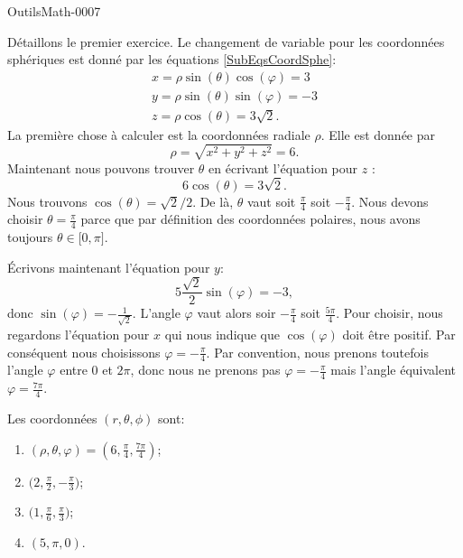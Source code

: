 
\begin{corrige}{OutilsMath-0007}

	Détaillons le premier exercice. Le changement de variable pour les coordonnées sphériques est donné par les équations \eqref{SubEqsCoordSphe}:
	\begin{subequations}
		\begin{align}
			x=\rho\sin(\theta)\cos(\varphi)=3\\
			y=\rho\sin(\theta)\sin(\varphi)=-3\\
			z=\rho\cos(\theta)=3\sqrt{2}.
		\end{align}
	\end{subequations}
	La première chose à calculer est la coordonnées radiale $\rho$. Elle est donnée par
	\begin{equation}
		\rho=\sqrt{x^2+y^2+z^2}=6.
	\end{equation}
	Maintenant nous pouvons trouver $\theta$ en écrivant l'équation pour $z$ :
	\begin{equation}
		6\cos(\theta)=3\sqrt{2}.
	\end{equation}
	Nous trouvons $\cos(\theta)=\sqrt{2}/2$. De là, $\theta$ vaut soit $\frac{ \pi }{ 4 }$ soit $-\frac{ \pi }{ 4 }$. Nous devons choisir $\theta=\frac{ \pi }{ 4 }$ parce que par définition des coordonnées polaires, nous avons toujours $\theta\in\mathopen[ 0 , \pi \mathclose]$.

	Écrivons maintenant l'équation pour $y$:
	\begin{equation}
		5\frac{ \sqrt{2} }{2}\sin(\varphi)=-3,
	\end{equation}
	donc $\sin(\varphi)=-\frac{1}{ \sqrt{2} }$. L'angle $\varphi$ vaut alors soir $-\frac{ \pi }{ 4 }$ soit $\frac{ 5\pi }{ 4 }$. Pour choisir, nous regardons l'équation pour $x$ qui nous indique que $\cos(\varphi)$ doit être positif. Par conséquent nous choisissons $\varphi=-\frac{ \pi }{ 4 }$. Par convention, nous prenons toutefois l'angle $\varphi$ entre $0$ et $2\pi$, donc nous ne prenons pas $\varphi=-\frac{ \pi }{ 4 }$ mais l'angle équivalent $\varphi=\frac{ 7\pi }{ 4 }$.

	Les coordonnées $(r,\theta,\phi)$ sont:
	\begin{enumerate}
		\item	
			$(\rho,\theta,\varphi)=(6,\frac{ \pi }{ 4 },\frac{ 7\pi }{ 4 })$;
		\item
			$\big( 2,\frac{ \pi }{2},-\frac{ \pi }{ 3 } \big)$;
		\item
			$\big( 1,\frac{ \pi }{ 6 },\frac{ \pi }{ 3 } \big)$;
		\item
			$(5,\pi,0)$.
	\end{enumerate}
	
\end{corrige}
